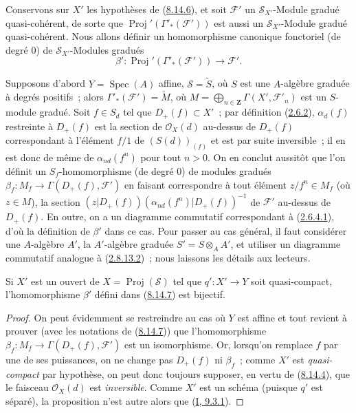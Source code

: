 \begin{env}[8.14.7]
\label{II.8.14.7-fr}
Conservons sur $X'$ les hypothèses de
(\hyperref[II.8.14.6-fr]{8.14.6}), et soit $\mathcal{F}'$ un
$\mathcal{S}_{X'}$-Module gradué quasi-cohérent, de sorte que
$\operatorname{Proj}'(\Gamma'_*(\mathcal{F}'))$ est aussi un
$\mathcal{S}_{X'}$-Module gradué quasi-cohérent. Nous allons définir un
homomorphisme canonique fonctoriel (de degré $0$) de
$\mathcal{S}_{X'}$-Modules gradués
\begin{equation}
\label{II.8.14.7.1-fr}
  \beta':\operatorname{Proj}'(\Gamma'_*(\mathcal{F}'))\to\mathcal{F}'.
\tag{8.14.7.1}
\end{equation}

Supposons d'abord $Y=\operatorname{Spec}(A)$ affine,
$\mathcal{S}=\widetilde{S}$, où $S$ est une $A$-algèbre graduée à degrés
positifs~; alors $\Gamma'_*(\mathcal{F}')=\widetilde{M}$, où
$M=\bigoplus_{n\in\mathbf{Z}}\Gamma(X',\mathcal{F}'_n)$ est un $S$-module
gradué. Soit $f\in S_d$ tel que $D_+(f)\subset X'$~; par définition
(\hyperref[II.2.6.2-fr]{2.6.2}), $\alpha_d(f)$ restreinte à $D_+(f)$ est la
section de $\mathcal{O}_X(d)$ au-dessus de $D_+(f)$ correspondant à
l'élément $f/1$ de $(S(d))_{(f)}$ et est par suite inversible~; il en est donc
de même de $\alpha_{nd}(f^n)$ pour tout $n>0$. On en conclut aussitôt que
l'on définit un $S_f$-homomorphisme (de degré $0$) de modules gradués
$\beta_f:M_f\to\Gamma(D_+(f),\mathcal{F}')$ en faisant correspondre à tout
élément $z/f^n\in M_f$ (où $z\in M$), la section
$(z|D_+(f))(\alpha_{nd}(f^n)|D_+(f))^{-1}$ de $\mathcal{F}'$ au-dessus de
$D_+(f)$. En outre, on a un diagramme commutatif correspondant à
(\hyperref[II.2.6.4.1-fr]{2.6.4.1}), d'où la définition de $\beta'$ dans ce
cas. Pour passer au cas général, il faut considérer une $A$-algèbre $A'$,
la $A'$-algèbre graduée $S'=S\otimes_A A'$, et utiliser un diagramme
commutatif analogue à (\hyperref[II.2.8.13.2-fr]{2.8.13.2})~; nous laissons
les détails aux lecteurs.
\end{env}

\begin{proposition}[8.14.8]
\label{II.8.14.8-fr}
Si $X'$ est un ouvert de $X=\operatorname{Proj}(\mathcal{S})$ tel que
$q':X'\to Y$ soit quasi-compact, l'homomorphisme $\beta'$ défini dans
(\hyperref[II.8.14.7-fr]{8.14.7}) est bijectif.
\end{proposition}

\begin{proof}
On peut évidemment se restreindre au cas où $Y$ est affine et tout revient à
prouver (avec les notations de (\hyperref[II.8.14.7-fr]{8.14.7})) que
l'homomorphisme $\beta_f:M_f\to\Gamma(D_+(f),\mathcal{F}')$ est un
isomorphisme. Or, lorsqu'on remplace $f$ par une de ses puissances, on ne
change pas $D_+(f)$ ni $\beta_f$~; comme $X'$ est \emph{quasi-compact} par
hypothèse, on peut donc toujours supposer, en vertu de
(\hyperref[II.8.14.4-fr]{8.14.4}), que le faisceau $\mathcal{O}_X(d)$ est
\emph{inversible}. Comme $X'$ est un schéma (puisque $q'$ est séparé), la
proposition n'est autre alors que (\hyperref[I.9.3.1-fr]{I, 9.3.1}).
\end{proof}


